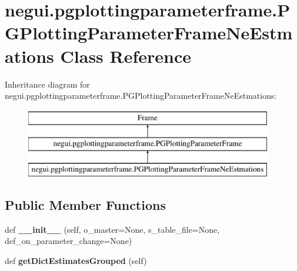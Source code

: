\hypertarget{classnegui_1_1pgplottingparameterframe_1_1PGPlottingParameterFrameNeEstmations}{}\section{negui.\+pgplottingparameterframe.\+P\+G\+Plotting\+Parameter\+Frame\+Ne\+Estmations Class Reference}
\label{classnegui_1_1pgplottingparameterframe_1_1PGPlottingParameterFrameNeEstmations}
Inheritance diagram for negui.\+pgplottingparameterframe.\+P\+G\+Plotting\+Parameter\+Frame\+Ne\+Estmations\+:\begin{figure}[H]
\begin{center}
\leavevmode
\includegraphics[height=3.000000cm]{classnegui_1_1pgplottingparameterframe_1_1PGPlottingParameterFrameNeEstmations}
\end{center}
\end{figure}
\subsection*{Public Member Functions}
\begin{DoxyCompactItemize}
\item 
def {\bfseries \+\_\+\+\_\+init\+\_\+\+\_\+} (self, o\+\_\+master=None, s\+\_\+table\+\_\+file=None, def\+\_\+on\+\_\+parameter\+\_\+change=None)\hypertarget{classnegui_1_1pgplottingparameterframe_1_1PGPlottingParameterFrameNeEstmations_ae9fd6fc97bb524d4fae854b97a025e94}{}\label{classnegui_1_1pgplottingparameterframe_1_1PGPlottingParameterFrameNeEstmations_ae9fd6fc97bb524d4fae854b97a025e94}

\item 
def {\bfseries get\+Dict\+Estimates\+Grouped} (self)\hypertarget{classnegui_1_1pgplottingparameterframe_1_1PGPlottingParameterFrameNeEstmations_ad2bc9b3169bd7f70eadec0efce562a16}{}\label{classnegui_1_1pgplottingparameterframe_1_1PGPlottingParameterFrameNeEstmations_ad2bc9b3169bd7f70eadec0efce562a16}

\end{DoxyCompactItemize}
